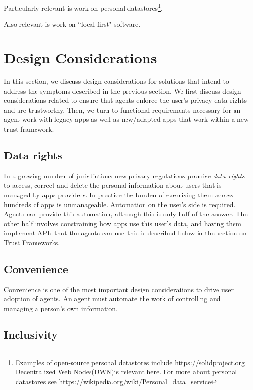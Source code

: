 \documentclass[11pt, oneside]{article}   	%
\begin{document}
Particularly relevant is work on personal datastores\footnote{Examples of open-source personal datastores include \url{https://solidproject.org} Decentralized Web Nodes(DWN)is relevant here. For more about personal datastores see \url{https://wikipedia.org/wiki/Personal\_data\_service}}. 

Also relevant is work on ``local-first" software.\cite{Kleppmann2019}

\section{Design Considerations} %

In this section, we discuss design considerations for solutions that intend to address the symptoms described in the previous section. We first discuss design considerations related to ensure that agents enforce the user's privacy data rights and are trustworthy. Then, we turn to functional requirements necessary for an agent work with legacy apps as well as new/adapted apps that work within a new trust framework.

\subsection{Data rights}

In a growing number of jurisdictions new privacy regulations promise \emph{data rights} to access, correct and delete the personal information about users that is managed by apps providers. In practice the burden of exercising them across hundreds of apps is unmanageable. Automation on the user's side is required. Agents can provide this automation, although this is only half of the answer. The other half involves constraining how apps use this user's data, and having them implement APIs that the agents can use--this is described below in the section on Trust Frameworks.

\subsection{Convenience}

Convenience is one of the most important design considerations to drive user adoption of agents. An agent must automate the work of controlling and managing a person's own information. 

\subsection{Inclusivity}
\end{document}
